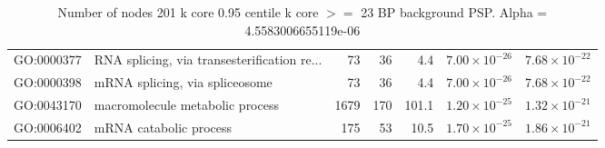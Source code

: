 \begin{table}[ht]
\begin{tabular}{llrrrrr}
  GO:0000377 & RNA splicing, via transesterification re... & 73 & 36 & 4.4 & $7.00 \times 10^{-26}$ & $7.68 \times 10^{-22}$ \\ 
  GO:0000398 & mRNA splicing, via spliceosome & 73 & 36 & 4.4 & $7.00 \times 10^{-26}$ & $7.68 \times 10^{-22}$ \\ 
  GO:0043170 & macromolecule metabolic process & 1679 & 170 & 101.1 & $1.20 \times 10^{-25}$ & $1.32 \times 10^{-21}$ \\ 
  GO:0006402 & mRNA catabolic process & 175 & 53 & 10.5 & $1.70 \times 10^{-25}$ & $1.86 \times 10^{-21}$ \\ 
   \hline
\end{tabular}
\caption{Number of nodes 201 k core 0.95 centile  k core $>=$ 23 BP background PSP. Alpha = 4.5583006655119e-06} 
\label{tab:Number of nodes 201 k core 0.95 centile  k core $>=$ 23 BP background PSP. Alpha = 4.5583006655119e-06}
\end{table}

